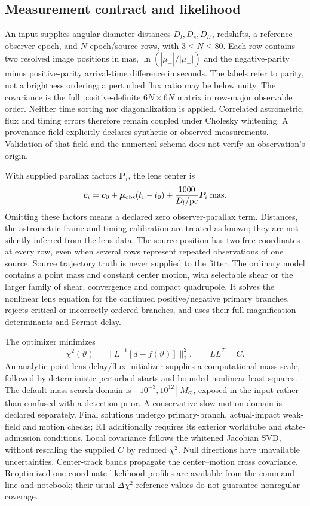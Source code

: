 \subsection{Measurement contract and likelihood}
An input supplies angular-diameter distances $D_l,D_s,D_{ls}$, redshifts,
a reference observer epoch, and $N$ epoch/source rows, with $3\le N\le80$.
Each row contains two resolved image positions in mas,
$\ln(|\mu_+|/|\mu_-|)$ and the negative-parity minus positive-parity
arrival-time difference in seconds. The labels refer to parity, not a
brightness ordering; a perturbed flux ratio may be below unity.
The covariance is the full positive-definite $6N\times6N$ matrix in
row-major observable order. Neither time sorting nor diagonalization is
applied. Correlated astrometric, flux and timing errors therefore remain
coupled under Cholesky whitening. A provenance field explicitly declares
synthetic or observed measurements. Validation of that field and the
numerical schema does not verify an observation's origin.

With supplied parallax factors $\boldsymbol P_i$, the lens center is
\begin{equation}
 \boldsymbol c_i=\boldsymbol c_0+
 \boldsymbol\mu_{\rm obs}(t_i-t_0)
 +\frac{1000}{D_l/\mathrm{pc}}\boldsymbol P_i\;\mathrm{mas}.
 \label{eq:product-track}
\end{equation}
Omitting these factors means a declared zero observer-parallax term.
Distances, the astrometric frame and timing calibration are treated as
known; they are not silently inferred from the lens data. The source
position has two free coordinates at every row, even when several rows
represent repeated observations of one source. Source trajectory truth
is never supplied to the fitter. The ordinary model contains a point
mass and constant center motion, with selectable shear or the larger
family of shear, convergence and compact quadrupole. It solves the
nonlinear lens equation for the continued positive/negative primary
branches, rejects critical or incorrectly ordered branches, and uses
their full magnification determinants and Fermat delay.

The optimizer minimizes
\begin{equation}
 \chi^2(\vartheta)=\|L^{-1}[d-f(\vartheta)]\|_2^2,
 \qquad LL^T=C.
 \label{eq:product-likelihood}
\end{equation}
An analytic point-lens delay/flux initializer supplies a computational
mass scale, followed by deterministic perturbed starts and bounded
nonlinear least squares. The default mass search domain is
$[10^{-3},10^{12}]M_\odot$, exposed in the input rather than confused
with a detection prior. A conservative slow-motion domain is declared
separately. Final solutions undergo primary-branch, actual-impact
weak-field and motion checks; R1 additionally requires its exterior
worldtube and state-admission conditions. Local covariance follows the whitened Jacobian SVD,
without rescaling the supplied $C$ by reduced $\chi^2$. Null directions
have unavailable uncertainties. Center-track bands propagate the
center--motion cross covariance. Reoptimized one-coordinate likelihood
profiles are available from the command line and notebook; their usual
$\Delta\chi^2$ reference values do not guarantee nonregular coverage.

